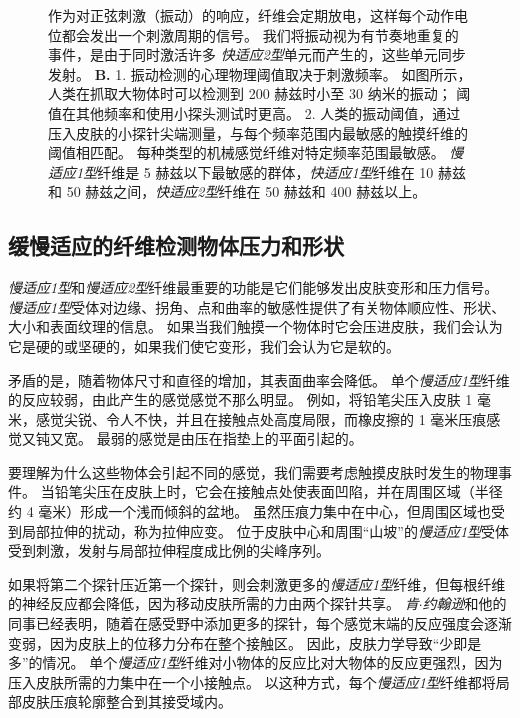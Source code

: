 \begin{figure}[htbp]
{		作为对正弦刺激（振动）的响应，纤维会定期放电，这样每个动作电位都会发出一个刺激周期的信号。
		我们将振动视为有节奏地重复的事件，是由于同时激活许多 \textit{快适应2型}单元而产生的，这些单元同步发射\cite{talbot1968sense}。
		\textbf{B.} 1. 振动检测的心理物理阈值取决于刺激频率。
		如图所示，人类在抓取大物体时可以检测到 200 赫兹时小至 30 纳米的振动；
		阈值在其他频率和使用小探头测试时更高\cite{brisben1999detection}。
		2. 人类的振动阈值，通过压入皮肤的小探针尖端测量，与每个频率范围内最敏感的触摸纤维的阈值相匹配。 
		每种类型的机械感觉纤维对特定频率范围最敏感。
		\textit{慢适应1型}纤维是 5 赫兹以下最敏感的群体，\textit{快适应1型}纤维在 10 赫兹和 50 赫兹之间，\textit{快适应2型}纤维在 50 赫兹和 400 赫兹以上\cite{mountcastle1972detection,johansson1982responses}。}
	\label{fig:19_8}
\end{figure}



\subsection{缓慢适应的纤维检测物体压力和形状}

\textit{慢适应1型}和\textit{慢适应2型}纤维最重要的功能是它们能够发出皮肤变形和压力信号。
\textit{慢适应1型}受体对边缘、拐角、点和曲率的敏感性提供了有关物体顺应性、形状、大小和表面纹理的信息。
如果当我们触摸一个物体时它会压进皮肤，我们会认为它是硬的或坚硬的，如果我们使它变形，我们会认为它是软的。


矛盾的是，随着物体尺寸和直径的增加，其表面曲率会降低。
单个\textit{慢适应1型}纤维的反应较弱，由此产生的感觉感觉不那么明显。
例如，将铅笔尖压入皮肤 1 毫米，感觉尖锐、令人不快，并且在接触点处高度局限，而橡皮擦的 1 毫米压痕感觉又钝又宽。
最弱的感觉是由压在指垫上的平面引起的。


要理解为什么这些物体会引起不同的感觉，我们需要考虑触摸皮肤时发生的物理事件。
当铅笔尖压在皮肤上时，它会在接触点处使表面凹陷，并在周围区域（半径约 4 毫米）形成一个浅而倾斜的盆地。
虽然压痕力集中在中心，但周围区域也受到局部拉伸的扰动，称为拉伸应变。
位于皮肤中心和周围“山坡”的\textit{慢适应1型}受体受到刺激，发射与局部拉伸程度成比例的尖峰序列。


如果将第二个探针压近第一个探针，则会刺激更多的\textit{慢适应1型}纤维，但每根纤维的神经反应都会降低，因为移动皮肤所需的力由两个探针共享。
\textit{肯$\cdot$约翰逊}和他的同事已经表明，随着在感受野中添加更多的探针，每个感觉末端的反应强度会逐渐变弱，因为皮肤上的位移力分布在整个接触区。
因此，皮肤力学导致“少即是多”的情况。
单个\textit{慢适应1型}纤维对小物体的反应比对大物体的反应更强烈，因为压入皮肤所需的力集中在一个小接触点。
以这种方式，每个\textit{慢适应1型}纤维都将局部皮肤压痕轮廓整合到其接受域内。


